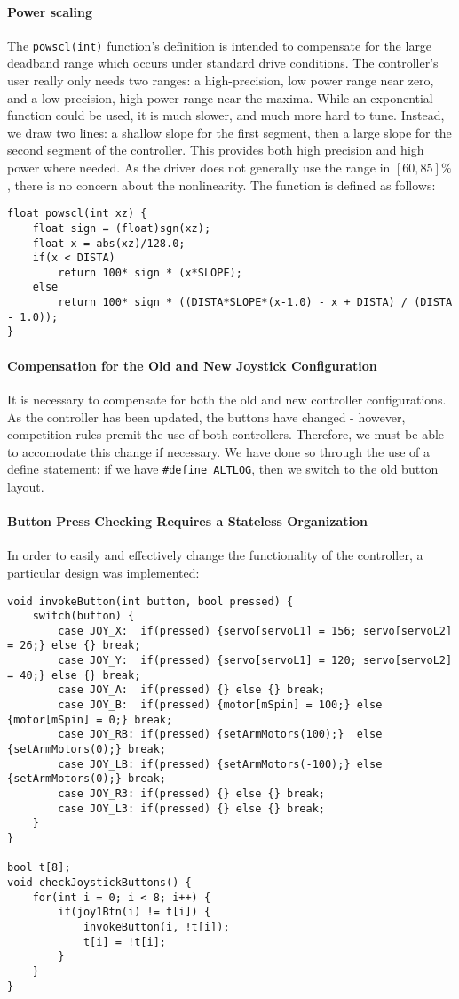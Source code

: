 \documentclass{article}
\begin{document}
\paragraph{Power scaling} The \lstinline{powscl(int)}{} function's definition is intended to compensate for the large deadband range which occurs under standard drive conditions. The controller's user really only needs two ranges: a high-precision, low power range near zero, and a low-precision, high power range near the maxima. While an exponential function could be used, it is much slower, and much more hard to tune. Instead, we draw two lines: a shallow slope for the first segment, then a large slope for the second segment of the controller. This provides both high precision and high power where needed. As the driver does not generally use the range in $[60,85]\%$, there is no concern about the nonlinearity. The function is defined as follows:

\begin{lstlisting}[tabsize=4]
float powscl(int xz) {
	float sign = (float)sgn(xz);
	float x = abs(xz)/128.0;
	if(x < DISTA)
		return 100* sign * (x*SLOPE);
	else
		return 100* sign * ((DISTA*SLOPE*(x-1.0) - x + DISTA) / (DISTA - 1.0));
}
\end{lstlisting}

\paragraph{Compensation for the Old and New Joystick Configuration} It is necessary to compensate for both the old and new controller configurations. As the controller has been updated, the buttons have changed - however, competition rules premit the use of both controllers. Therefore, we must be able to accomodate this change if necessary. We have done so through the use of a define statement: if we have \lstinline{#define ALTLOG}{}, then we switch to the old button layout.

\paragraph{Button Press Checking Requires a Stateless Organization} In order to easily and effectively change the functionality of the controller, a particular design was implemented:

\begin{lstlisting}[tabsize=4]
void invokeButton(int button, bool pressed) {
	switch(button) {
		case JOY_X:  if(pressed) {servo[servoL1] = 156; servo[servoL2] = 26;} else {} break;
		case JOY_Y:  if(pressed) {servo[servoL1] = 120; servo[servoL2] = 40;} else {} break;
		case JOY_A:  if(pressed) {} else {} break;
		case JOY_B:  if(pressed) {motor[mSpin] = 100;} else {motor[mSpin] = 0;} break;
		case JOY_RB: if(pressed) {setArmMotors(100);}  else {setArmMotors(0);} break;
		case JOY_LB: if(pressed) {setArmMotors(-100);} else {setArmMotors(0);} break;
		case JOY_R3: if(pressed) {} else {} break;
		case JOY_L3: if(pressed) {} else {} break;
	}
}

bool t[8];
void checkJoystickButtons() {
	for(int i = 0; i < 8; i++) {
		if(joy1Btn(i) != t[i]) {
			invokeButton(i, !t[i]);
			t[i] = !t[i]; 
		}
	}
}
\end{lstlisting}
\end{document}
